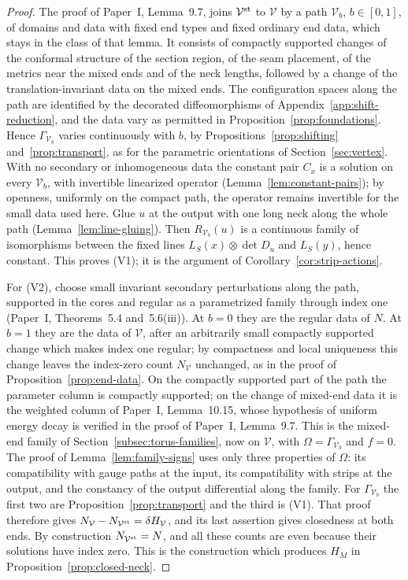\documentclass[11pt]{amsart}
\theoremstyle{definition}
\theoremstyle{remark}
\theoremstyle{plain}
\numberwithin{equation}{section}
\begin{document}
\begin{proof}
The proof of Paper~I, Lemma~9.7, joins $\mathcal V^{\rm st}$ to
$\mathcal V$ by a path $\mathcal V_b$, $b\in[0,1]$, of domains and data
with fixed end types and fixed ordinary end data, which stays in the
class of that lemma. It consists of compactly supported changes of the
conformal structure of the section region, of the seam placement, of the
metrics near the mixed ends and of the neck lengths, followed by a change
of the translation-invariant data on the mixed ends. The configuration
spaces along the path are identified by the decorated diffeomorphisms of
Appendix~\ref{app:shift-reduction}, and the data vary as permitted in
Proposition~\ref{prop:foundations}. Hence $\Gamma_{\mathcal V_b}$ varies
continuously with $b$, by Propositions~\ref{prop:shifting}
and~\ref{prop:transport}, as for the parametric orientations of
Section~\ref{sec:vertex}. With no secondary or inhomogeneous data the
constant pair $C_x$ is a solution on every $\mathcal V_b$, with
invertible linearized operator (Lemma~\ref{lem:constant-pairs}); by
openness, uniformly on the compact path, the operator remains invertible
for the small data used here. Glue $u$ at the output with one long neck
along the whole path (Lemma~\ref{lem:line-gluing}). Then
$R_{\mathcal V_b}(u)$ is a continuous family of isomorphisms between the
fixed lines $L_S(x)\otimes\det D_u$ and $L_S(y)$, hence constant. This
proves (V1); it is the argument of Corollary~\ref{cor:strip-actions}.

For (V2), choose small invariant secondary perturbations along the path,
supported in the cores and regular as a parametrized family through
index one (Paper~I, Theorems~5.4 and~5.6(iii)). At $b=0$ they are the
regular data of $N$. At $b=1$ they are the data of $\mathcal V$, after an
arbitrarily small compactly supported change which makes index one
regular; by compactness and local uniqueness this change leaves the
index-zero count $N_{\mathcal V}$ unchanged, as in the proof of
Proposition~\ref{prop:end-data}. On the compactly
supported part of the path the parameter column is compactly supported;
on the change of mixed-end data it is the weighted column of Paper~I,
Lemma~10.15, whose hypothesis of uniform energy decay is verified in the
proof of Paper~I, Lemma~9.7. This is the mixed-end family of
Section~\ref{subsec:torus-families}, now on $\mathcal V$, with
$\Omega=\Gamma_{\mathcal V_b}$ and $f=0$. The proof of
Lemma~\ref{lem:family-signs} uses only three properties of $\Omega$: its
compatibility with gauge paths at the input, its compatibility with
strips at the output, and the constancy of the output differential along
the family. For $\Gamma_{\mathcal V_b}$ the first two are
Proposition~\ref{prop:transport} and the third is (V1). That proof
therefore gives $N_{\mathcal V}-N_{\mathcal V^{\rm st}}=\delta H_{\mathcal V}$,
and its last assertion gives closedness at both ends. By construction
$N_{\mathcal V^{\rm st}}=N$, and all these counts are even because their
solutions have index zero. This is the construction which produces $H_M$
in Proposition~\ref{prop:closed-neck}.
\end{proof}
\end{document}
